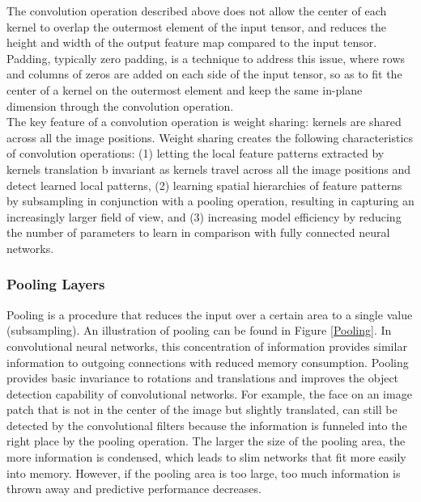 The convolution operation described above does not allow the center of each kernel to overlap the outermost element of the input tensor, and reduces the height and width of the output feature map compared to the input tensor. Padding, typically zero padding, is a technique to address this issue, where rows and columns of zeros are added on each side of the input tensor, so as to fit the center of a kernel on the outermost element and keep the same in-plane dimension through the convolution operation. \\

The key feature of a convolution operation is weight sharing: kernels are shared across all the image positions. Weight sharing creates the following characteristics of convolution operations: (1) letting the local feature patterns extracted by kernels translation b invariant as kernels travel across all the image positions and detect learned local patterns, (2) learning spatial hierarchies of feature patterns by subsampling in conjunction with a pooling operation, resulting in capturing an increasingly larger field of view, and (3) increasing model efficiency by reducing the number of parameters to learn in comparison with fully connected neural networks. \\


\subsubsection*{Pooling Layers}

Pooling is a procedure that reduces the input over a certain area to a single value (subsampling). An illustration of pooling can be found in Figure \ref{Pooling}. In convolutional neural networks, this concentration of information provides similar information to outgoing connections with reduced memory consumption. Pooling provides basic invariance to rotations and translations and improves the object detection capability of convolutional networks. For example, the face on an image patch that is not in the center of the image but slightly translated, can still be detected by the convolutional filters because the information is funneled into the right place by the pooling operation. The larger the size of the pooling area, the more information is condensed, which leads to slim networks that fit more easily into memory. However, if the pooling area is too large, too much information is thrown away and predictive performance decreases. \\

